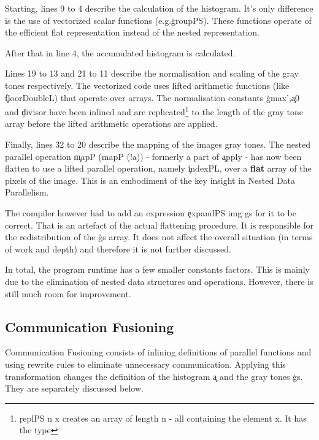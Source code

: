     Starting, lines 9 to 4 describe the calculation of the histogram.
    It's only difference is the use of vectorized scalar functions (e.g.\c{groupPS}). These functions operate of the efficient flat
    representation instead of the nested representation.
    
    After that in line 4, the accumulated histogram is calculated.
    
    Lines 19 to 13 and 21 to 11 describe the normalisation and scaling of the gray tones respectively.
    The vectorized code uses lifted arithmetic functions (like \c{floorDoubleL}) that
    operate over arrays.
    The normalisation constants \c{gmax'},\c{a0} and \c{divisor}
    have been inlined and are replicated\footnote{\c{replPS n x} creates an array of length n - all containing the element x. It has the type }
    to the length of the gray tone array before the lifted arithmetic operations are applied.
    
    
    Finally, lines 32 to 20 describe the mapping of the images gray tones.
    The nested parallel operation \c{mapP (mapP (!a))} - formerly a part of \c{apply} - 
    has now been flatten to use a lifted parallel operation, namely \c{indexPL}, over a \textbf{flat} array of
    the pixels of the image. This is an embodiment of the key insight in Nested Data Parallelism.
    
    The compiler however had to add an expression \c{expandPS img gs} for it to be
    correct. That is an artefact of the actual flattening procedure.
    It is responsible for the redistribution of the \c{gs} array. It does not affect the
    overall situation (in terms of work and depth) and therefore
    it is not further discussed.
    
    In total, the program runtime has a few smaller constants factors. This is mainly due to the elimination of nested data structures
    and operations. However, there is still much room for improvement.
    
  \subsection{Communication Fusioning}
    
    Communication Fusioning consists of inlining definitions of parallel functions and using rewrite rules to eliminate
    unnecessary communication. Applying this transformation changes the definition of the histogram \c{a} and the
    gray tones \c{gs}. They are separately discussed below.
    
